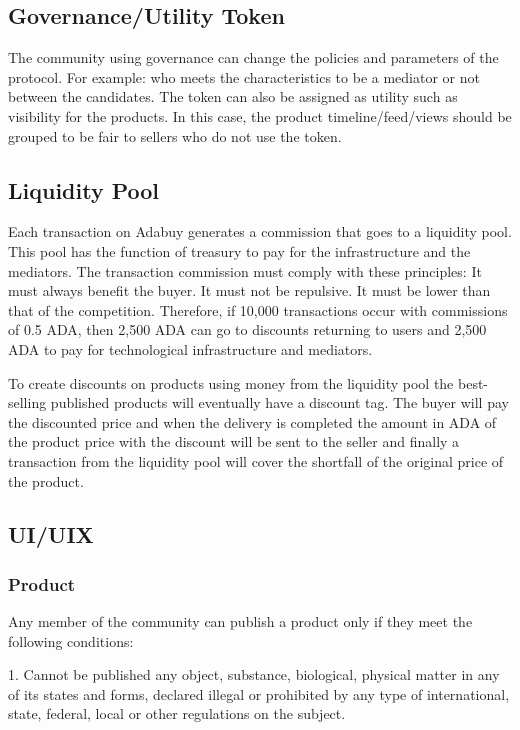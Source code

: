 \documentclass[12pt]{article}
\begin{document}
\subsection { Governance/Utility Token} 

The community using governance can change the policies and parameters of the protocol. For example: who meets the characteristics to be a mediator or not between the candidates. The token can also be assigned as utility such as visibility for the products. In this case, the product timeline/feed/views should be grouped to be fair to sellers who do not use the token.


\subsection { Liquidity Pool }

Each transaction on Adabuy generates a commission that goes to a liquidity pool. This pool has the function of treasury to pay for the infrastructure and the mediators.
The transaction commission must comply with these principles: It must always benefit the buyer. It must not be repulsive. It must be lower than that of the competition. Therefore, if 10,000 transactions occur with commissions of 0.5 ADA, then 2,500 ADA can go to discounts returning to users and 2,500 ADA to pay for technological infrastructure and mediators. 

To create discounts on products using money from the liquidity pool the best-selling published products will eventually have a discount tag. The buyer will pay the discounted price and when the delivery is completed the amount in ADA of the product price with the discount will be sent to the seller and finally a transaction from the liquidity pool will cover the shortfall of the original price of the product.

\subsection{ UI/UIX }

\subsubsection { Product } 

Any member of the community can publish a product only if they meet the following conditions:

1. Cannot be published any object, substance, biological, physical matter in any of its states and forms, declared illegal or prohibited by any type of international, state, federal, local or other regulations on the subject.
\end{document}
